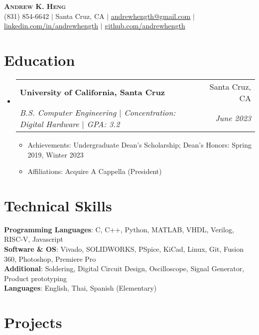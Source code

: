 \documentclass[letterpaper,11pt]{article}
\makeatletter
\newcommand{\resumeItem}[1]{
  \item\small{
    {#1 \vspace{-2pt}}
  }
}
\newcommand{\resumeSubheading}[4]{
  \vspace{-2pt}\item
    \begin{tabular*}{0.97\textwidth}[t]{l@{\extracolsep{\fill}}r}
      \textbf{#1} & #2 \\
      \textit{\small#3} & \textit{\small #4} \\
    \end{tabular*}\vspace{-7pt}
}
\newcommand{\resumeSubHeadingListStart}{\begin{itemize}[leftmargin=0.15in, label={}]}
\newcommand{\resumeSubHeadingListEnd}{\end{itemize}}
\newcommand{\resumeItemListStart}{\begin{itemize}}
\newcommand{\resumeItemListEnd}{\end{itemize}\vspace{-5pt}}
\makeatother
\begin{document}

\begin{center}
    \textbf{\Huge \scshape Andrew K. Heng} \\ \vspace{1pt}
    \small (831) 854-6642 $|$ Santa Cruz, CA $|$ \href{mailto:andrewhength@gmail.com}{\underline{andrewhength@gmail.com}} $|$ 
    \href{https://linkedin.com/in/andrewhength}{\underline{linkedin.com/in/andrewhength}} $|$
    \href{https://github.com/andrewhength}{\underline{github.com/andrewhength}}
\end{center}


\section{Education}

\resumeSubHeadingListStart
  
    \resumeSubheading
      {University of California, Santa Cruz}{Santa Cruz, CA}
      {B.S. Computer Engineering $|$ Concentration: Digital Hardware $|$ GPA: 3.2}{June 2023}
    \resumeItemListStart
    \resumeItem{Achievements: Undergraduate Dean's Scholarship; Dean's Honors: Spring 2019, Winter 2023}
    \resumeItem{Affiliations: Acquire A Cappella (President)}
    \resumeItemListEnd

\resumeSubHeadingListEnd


\section{Technical Skills}
 \begin{itemize}[leftmargin=0.15in, label={}]
    \small{\item{
     \textbf{Programming Languages}{: C, C++, Python, MATLAB, VHDL, Verilog, RISC-V, Javascript} \\
     \textbf{Software \& OS}{: Vivado, SOLIDWORKS, PSpice, KiCad, Linux, Git, Fusion 360, Photoshop, Premiere Pro} \\
     \textbf{Additional}{: Soldering, Digital Circuit Design, Oscilloscope, Signal Generator, Product prototyping} \\
     \textbf{Languages}{: English, Thai, Spanish (Elementary)}

    }}
 \end{itemize}


\section{Projects}
\end{document}
